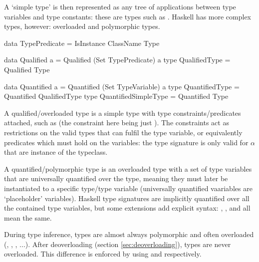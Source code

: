 \documentclass[dissertation.tex]{subfiles}
\begin{document}
{    A `simple type' is then represented as any tree of applications between type variables and type constants: these are
    types such as . Haskell has more complex types, however: overloaded and polymorphic
    types.

    \begin{haskellfigure}
    data TypePredicate = IsInstance ClassName Type

    data Qualified a = Qualified (Set TypePredicate) a
    type QualifiedType = Qualified Type

    data Quantified a = Quantified (Set TypeVariable) a
    type QuantifiedType = Quantified QualifiedType
    type QuantifiedSimpleType = Quantified Type
    \end{haskellfigure}

    A qualified/overloaded type is a simple type with type constraints/predicates attached, such as  (the constraint here being just ). The constraints act as restrictions on the valid types that can fulfil the type variable, or
    equivalently predicates which must hold on the variables: the type signature is only valid for \(\alpha\) that are
    instance of the  typeclass.
    
    A quantified/polymorphic type is an overloaded type with a set of type variables that are universally quantified
    over the type, meaning they must later be instantiated to a specific type/type variable (universally quantified
    vaariables are `placeholder' variables). Haskell type signatures are implicitly quantified over all the contained
    type variables, but some extensions add explicit syntax: , , and  all mean the same.

    During type inference, types are almost always polymorphic and often overloaded (, , , ...). After deoverloading (section \ref{sec:deoverloading}), types are never overloaded. This
    difference is enforced by using  and  respectively.

}
\end{document}
